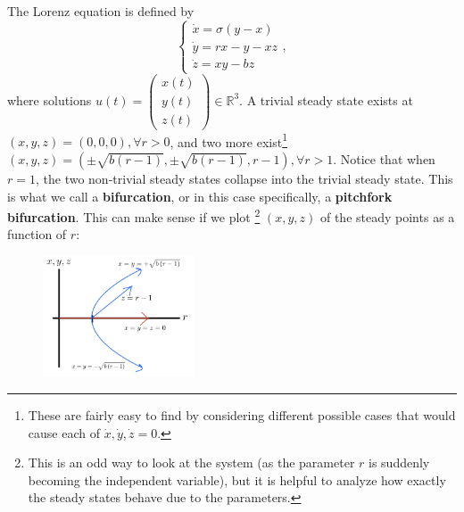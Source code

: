 \documentclass[12pt]{article}
\begin{document}
The Lorenz equation is defined by \[\begin{cases}
  \dot{x} = \sigma(y-x)\\
  \dot{y} = rx-y - xz\\
  \dot{z} = xy - bz
\end{cases},\] where solutions $u(t) = \begin{pmatrix}
  x(t)\\
  y(t)\\
  z(t)
\end{pmatrix} \in \mathbb{R}^3$. A trivial steady state exists at $(x,y,z) = (0,0,0), \forall r > 0$, and two more exist\footnote{These are fairly easy to find by considering different possible cases that would cause each of $\dot{x}, \dot{y}, \dot{z} = 0.$} $(x,y,z) = (\pm \sqrt{b(r-1)}, \pm \sqrt{b(r-1)}, r-1), \forall r > 1$. Notice that when $r = 1$, the two non-trivial steady states collapse into the trivial steady state. This is what we call a \textbf{bifurcation}, or in this case specifically, a \textbf{pitchfork bifurcation}. This can make sense if we plot \footnote{This is an odd way to look at the system (as the parameter $r$ is suddenly becoming the independent variable), but it is helpful to analyze how exactly the steady states behave due to the parameters.} $(x,y,z)$ of the steady points as a function of $r$:
\begin{figure}[h!]
  \centering
  \includegraphics*[width=0.4\textwidth]{figures/example1-2-1a.png}
\end{figure}
\end{document}
